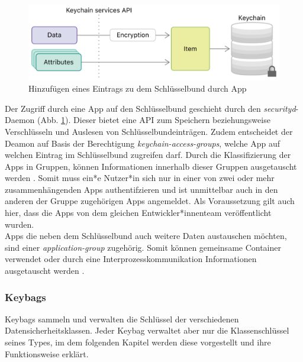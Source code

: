 \begin{figure}[h]
	\centering
  		\includegraphics[width=1\textwidth]{../images/keychain-api-example}
		\caption{Hinzufügen eines Eintrags zu dem Schlüsselbund durch App \cite{apple2020keychain_items}}
		\label{fig:add-entry-to-keychain}
\end{figure}

Der Zugriff durch eine App auf den Schlüsselbund geschieht durch den \textit{securityd}-Daemon (Abb. \ref{fig:add-entry-to-keychain}). Dieser bietet eine API zum Speichern beziehungsweise Verschlüsseln und Auslesen von Schlüsselbundeinträgen. Zudem  entscheidet der Deamon auf Basis der Berechtigung \textit{keychain-access-groups}, welche App auf welchen Eintrag im Schlüsselbund zugreifen darf. Durch die Klassifizierung der Apps in Gruppen, können Informationen innerhalb dieser Gruppen ausgetauscht werden \cite{apple2020keychain_item_groups}. Somit muss ein*e Nutzer*in sich nur in einer von zwei oder mehr zusammenhängenden Apps authentifzieren und ist unmittelbar auch in den anderen der Gruppe zugehörigen Apps angemeldet. Als Voraussetzung gilt auch hier, dass die Apps von dem gleichen Entwickler*innenteam veröffentlicht wurden. \\
Apps die neben dem Schlüsselbund auch weitere Daten austauschen möchten, sind einer \textit{application-group} zugehörig.  Somit können gemeinsame Container verwendet oder durch eine Interprozesskommunikation Informationen ausgetauscht werden \cite{apple2020keychain_application_groups}. 


\subsubsection{Keybags}
Keybags sammeln und verwalten die Schlüssel der verschiedenen Datensicherheitsklassen. Jeder Keybag verwaltet aber
nur die Klassenschlüssel seines Types, im dem folgenden Kapitel werden diese vorgestellt und ihre 
Funktionsweise erklärt. \cite{apple2020}


